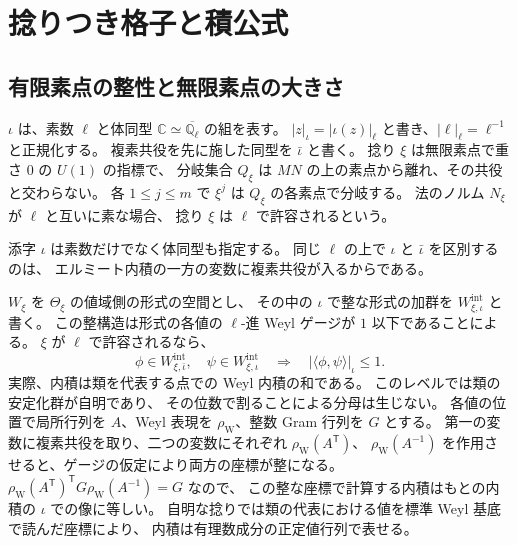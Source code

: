 \section{捻りつき格子と積公式}\label{sec:lattices}

\subsection{有限素点の整性と無限素点の大きさ}

\(\iota\) は、素数 \(\ell\) と体同型
\(\mathbb C\simeq\overline{\mathbb Q_\ell}\) の組を表す。
\(|z|_\iota=|\iota(z)|_\ell\) と書き、\(|\ell|_\ell=\ell^{-1}\) と正規化する。
複素共役を先に施した同型を \(\bar\iota\) と書く。
捻り \(\xi\) は無限素点で重さ \(0\) の \(U(1)\) の指標で、
分岐集合 \(Q_\xi\) は \(MN\) の上の素点から離れ、その共役と交わらない。
各 \(1\le j\le m\) で \(\xi^j\) は \(Q_\xi\) の各素点で分岐する。
法のノルム \(N_\xi\) が \(\ell\) と互いに素な場合、
捻り \(\xi\) は \(\ell\) で許容されるという。

\begin{editorialnote}
添字 \(\iota\) は素数だけでなく体同型も指定する。
同じ \(\ell\) の上で \(\iota\) と \(\bar\iota\) を区別するのは、
エルミート内積の一方の変数に複素共役が入るからである。
\end{editorialnote}

\(W_\xi\) を \(\Theta_\xi\) の値域側の形式の空間とし、
その中の \(\iota\) で整な形式の加群を \(W^{\mathrm{int}}_{\xi,\iota}\) と書く。
この整構造は形式の各値の \(\ell\)-進 Weyl ゲージが \(1\) 以下であることによる。
\(\xi\) が \(\ell\) で許容されるなら、
\[
  \phi\in W^{\mathrm{int}}_{\xi,\bar\iota},\quad
  \psi\in W^{\mathrm{int}}_{\xi,\iota}
  \quad\Longrightarrow\quad
  |\langle\phi,\psi\rangle|_\iota\le1 .
\]
実際、内積は類を代表する点での Weyl 内積の和である。
このレベルでは類の安定化群が自明であり、
その位数で割ることによる分母は生じない。
各値の位置で局所行列を \(A\)、Weyl 表現を \(\rho_{\mathrm{W}}\)、整数 Gram 行列を \(G\) とする。
第一の変数に複素共役を取り、二つの変数にそれぞれ \(\rho_{\mathrm{W}}(A^{\mathsf T})\)、
\(\rho_{\mathrm{W}}(A^{-1})\) を作用させると、ゲージの仮定により両方の座標が整になる。
\(\rho_{\mathrm{W}}(A^{\mathsf T})^{\mathsf T}G\rho_{\mathrm{W}}(A^{-1})=G\) なので、
この整な座標で計算する内積はもとの内積の \(\iota\) での像に等しい。
自明な捻りでは類の代表における値を標準 Weyl 基底で読んだ座標により、
内積は有理数成分の正定値行列で表せる。

